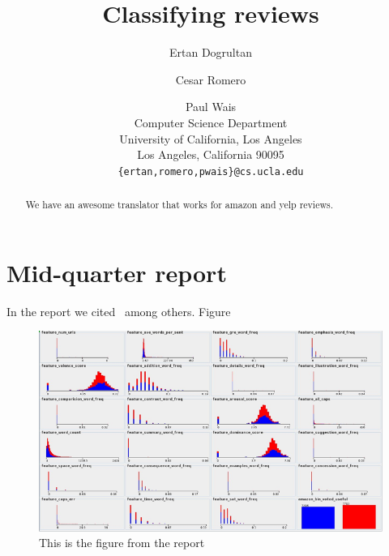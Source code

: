 \documentclass[letterpaper]{article}
\title{Classifying reviews}
\author{Ertan Dogrultan \and Cesar Romero \and Paul Wais\\
Computer Science Department \\
University of California, Los Angeles\\
Los Angeles, California 90095\\
\texttt{\{ertan,romero,pwais\}@cs.ucla.edu}}
\begin{document}
\maketitle{}
\begin{abstract}
  We have an awesome translator that works for amazon and yelp reviews.
\end{abstract}

\section{Mid-quarter report}
\label{sec:mid-quarter-report}

In the report we cited~\cite{citeulike:352583} among others. Figure~

\begin{figure}[h]
  \centering
  \includegraphics[scale=.5]{features_distributions}
  \caption{This is the figure from the report}
  \label{fig:dist}
\end{figure}



\end{document}
